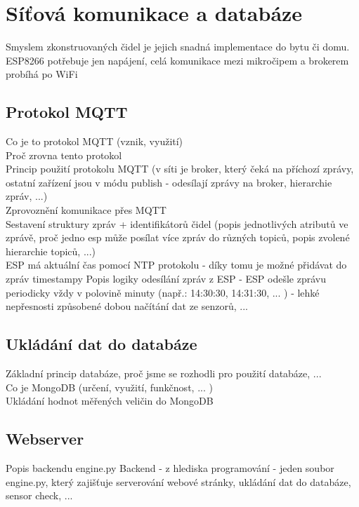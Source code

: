 \chapter{Síťová komunikace a databáze} \label{chap:methods}

Smyslem zkonstruovaných čidel je jejich snadná implementace do bytu či domu. \\
ESP8266 potřebuje jen napájení, celá komunikace mezi mikročipem a brokerem probíhá po WiFi \\

\section{Protokol MQTT} \label{sec:protocol_mqtt}

Co je to protokol MQTT (vznik, využití) \\
Proč zrovna tento protokol \\
Princip použití protokolu MQTT (v síti je broker, který čeká na příchozí zprávy, ostatní zařízení jsou v módu publish - odesílají zprávy na broker, hierarchie zpráv, ...) \\
Zprovoznění komunikace přes MQTT \\ 
Sestavení struktury zpráv + identifikátorů čidel (popis jednotlivých atributů ve zprávě, proč jedno esp může posílat více zpráv do různých topiců, popis zvolené hierarchie topiců, ...) \\
ESP má aktuální čas pomocí NTP protokolu - díky tomu je možné přidávat do zpráv timestampy
Popis logiky odesílání zpráv z ESP - ESP odešle zprávu periodicky vždy v polovině minuty (např.: 14:30:30, 14:31:30, ... ) - lehké nepřesnosti způsobené dobou načítání dat ze senzorů, ... \\


\section{Ukládání dat do databáze} \label{sec:database}

Základní princip databáze, proč jsme se rozhodli pro použití databáze,  ... \\
Co je MongoDB (určení, využití, funkčnost, ... ) \\
Ukládání hodnot měřených veličin do MongoDB \\

\section{Webserver} \label{sec:webserver}

Popis backendu engine.py
Backend - z hlediska programování - jeden soubor engine.py, který zajišťuje serverování webové stránky, ukládání dat do databáze, sensor check, ... \\